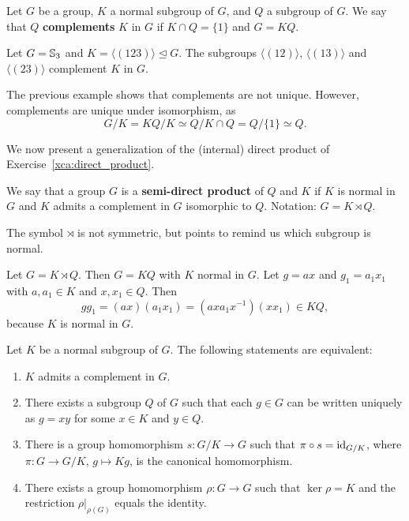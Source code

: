 \begin{definition}
Let $G$ be a group, $K$ a normal subgroup of $G$, and $Q$ a subgroup of $G$. We say
that $Q$ \textbf{complements} $K$ in $G$ if $K\cap Q=\{1\}$ and $G=KQ$.
\end{definition}

\begin{example}
Let $G=\mathbb{S}_3$ and $K=\langle (123)\rangle\unlhd G$. The subgroups
$\langle (12)\rangle$, $\langle
(13)\rangle$ and $\langle (23)\rangle$ complement $K$ in $G$.
\end{example}

The previous example shows that complements are not unique. However, 
complements are unique under isomorphism, as 
\[
G/K= KQ/K\simeq Q/K\cap Q=Q/\{1\}\simeq Q.
\]

We now present a generalization of the (internal) direct product of
Exercise~\ref{xca:direct_product}. 

\begin{definition}
We say that a group $G$ is a \textbf{semi-direct product} of $Q$ and $K$ if $K$ 
is normal in $G$ and 
$K$ admits a complement in $G$ isomorphic to $Q$. Notation: $G=K\rtimes Q$.
\end{definition}

The symbol $\rtimes$ is not symmetric, but points to remind us which subgroup is normal. 

Let $G=K\rtimes Q$. Then $G=KQ$ with $K$ normal in $G$. 
Let $g=ax$ and $g_1=a_1x_1$ with $a,a_1\in K$ and $x,x_1\in Q$. 
Then 
\[
gg_1=(ax)(a_1x_1)=(axa_1x^{-1})(xx_1)\in KQ,
\]
because $K$ is normal in $G$. 

\begin{theorem}
Let $K$ be a normal subgroup of $G$. The following statements are equivalent:
\begin{enumerate}
\item $K$ admits a complement in $G$.
\item There exists a subgroup $Q$ of $G$ such that each $g\in G$ can be written uniquely 
as $g=xy$ for some 
$x\in K$ and $y\in Q$.
\item There is a group homomorphism $s\colon G/K\to G$ such that $\pi\circ s=\operatorname{id}_{G/K}$, where $\pi\colon G\to G/K
$, $g\mapsto Kg$, is the canonical homomorphism.
\item There exists a group homomorphism $\rho\colon G\to G$ such that $\ker\rho=K$ and the restriction $\rho|_{\rho(G)}$ equals the identity. 
\end{enumerate}
\end{theorem}

